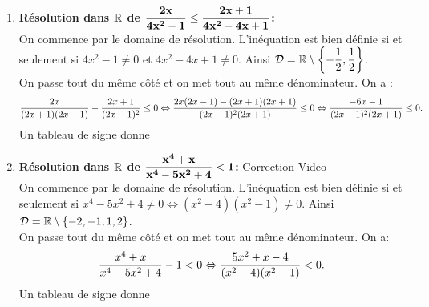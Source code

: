 \documentclass[a4paper, 11pt]{article}
\begin{document}
\begin{correction}
\begin{enumerate}
\item \textbf{R\'esolution dans $\mathbf{\mathbb{R}}$ de $\mathbf{\displaystyle\frac{2x}{4x^2-1}\leq \displaystyle\frac{2x+1}{4x^2-4x+1}}$:}\\
\noindent On commence par le domaine de r\'esolution. L'in\'equation est bien d\'efinie si et seulement si $4x^2-1\not= 0$ et $4x^2-4x+1\not= 0$. Ainsi $\mathcal{D}=\mathbb{R}\setminus\left\lbrace -\displaystyle\frac{1}{2},\displaystyle\frac{1}{2}\right\rbrace$.\\
\noindent On passe tout du m\^{e}me c\^{o}t\'e et on met tout au m\^{e}me d\'enominateur. 
On a :
$$\displaystyle\frac{2x}{(2x+1)(2x-1)}-\displaystyle\frac{2x+1}{(2x-1)^2}\leq 0 \Leftrightarrow \displaystyle\frac{ 2x(2x-1)-(2x+1)(2x+1)  }{(2x-1)^2(2x+1)}\leq 0 \Leftrightarrow \displaystyle\frac{ -6x-1  }{(2x-1)^2(2x+1)}\leq 0.$$ 
Un tableau de signe donne 
\item \textbf{R\'esolution dans $\mathbf{\mathbb{R}}$ de $\mathbf{ \displaystyle\frac{x^4+x}{x^4-5x^2+4}<1}$:} \href{https://youtu.be/JDyq8MIuZuw}{Correction Video}\\
\noindent On commence par le domaine de r\'esolution. L'in\'equation est bien d\'efinie si et seulement si $x^4-5x^2+4\not= 0\Leftrightarrow (x^2-4)(x^2-1)\not= 0$. Ainsi $\mathcal{D}=\mathbb{R}\setminus\left\lbrace -2,-1,1,2\right\rbrace$.\\
\noindent On passe tout du m\^{e}me c\^{o}t\'e et on met tout au m\^{e}me d\'enominateur. On a: 
$$\displaystyle\frac{x^4+x}{x^4-5x^2+4}-1<0\Leftrightarrow \displaystyle\frac{5x^2+x-4}{(x^2-4)(x^2-1)}<0.$$ 
Un tableau de signe donne 


\end{enumerate}
\end{correction}
\end{document}
